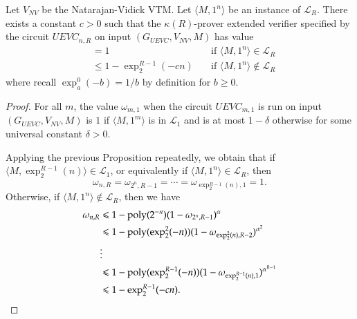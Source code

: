 \begin{corollary}
\label{cor:recursive_enl}
Let $V_{NV}$ be the Natarajan-Vidick VTM. Let $\langle M,1^n \rangle$ be an instance of $\mathcal{L}_R$. There exists a constant $c > 0$ such that the $\kappa(R)$-prover extended verifier specified by the circuit $UEVC_{n,R}$ on input $(G_{UEVC},V_{NV},M)$ has value 
\begin{align*}
		&= 1  \quad & \text{if } \langle M,1^n \rangle\in \mathcal{L}_R \\
		&\leq 1 - \exp^{R-1}_2(-cn) \quad &\text{if } \langle M,1^n \rangle\notin \mathcal{L}_R
\end{align*}
where recall $\exp^0_a(-b) = 1/b$ by definition for $b \geq 0$.
\end{corollary}
\begin{proof}
	For all $m$, the value $\omega_{m,1}$ when the circuit $UEVC_{m,1}$ is run on input $(G_{UEVC},V_{NV},M)$ is $1$ if $\langle M,1^m \rangle$ is in $\mathcal{L}_1$ and is at most $1 - \delta$ otherwise for some universal constant $\delta > 0$.
	
	Applying the previous Proposition repeatedly, we obtain that if $\langle M,\exp^{R-1}_2(n) \rangle \in \mathcal{L}_1$, or equivalently if $\langle M,1^n \rangle \in \mathcal{L}_R$, then
	\[
		\omega_{n,R} = \omega_{2^n,R-1} = \cdots = \omega_{\exp^{R-1}_2(n),1} = 1.
	\]
	Otherwise, if  $\langle M,1^n \rangle \notin \mathcal{L}_R$, then we have
	\begin{align*}
		\omega_{n,R} &\leqslant 1 - \operatorname{poly}(2^{-n})(1-\omega_{2^n,R-1})^\alpha \\
					&\leqslant 1 - \operatorname{poly}(\exp^2_2(-n))(1- \omega_{\exp^2_2(n),R-2})^{\alpha^2} \\
					&\vdots \\
					&\leqslant 1 - \operatorname{poly}(\exp^{R-1}_2(-n))(1-\omega_{\exp^{R-1}_2(n),1})^{\alpha^{R-1}} \\
					&\leqslant 1 - \exp^{R-1}_2(-cn).
	\end{align*}
\end{proof}



